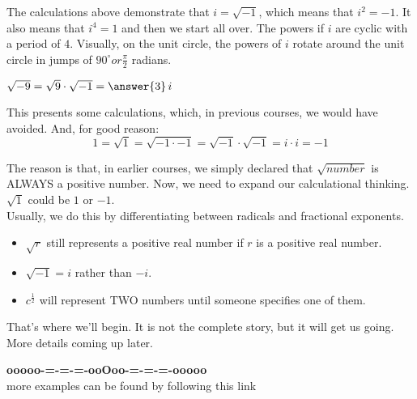 \documentclass{ximera}
\begin{document}
The calculations above demonstrate that $i = \sqrt{-1}$, which means that $i^2 = -1$.  It also means that $i^4 = 1$ and then we start all over.  The powers if $i$ are cyclic with a period of $4$.  Visually, on the unit circle, the powers of $i$ rotate around the unit circle in jumps of $90^{\circ} or \frac{\pi}{2}$ radians.

\begin{question}


$\sqrt{-9} = \sqrt{9} \cdot \sqrt{-1} =  \answer{3} \, i$

\end{question}

This presents some calculations, which, in previous courses, we would have avoided. And, for good reason:\\

\[  1 = \sqrt{1} = \sqrt{-1 \cdot -1} = \sqrt{-1} \cdot \sqrt{-1} = i \cdot i = -1   \]


The reason is that, in earlier courses, we simply declared that $\sqrt{number}$ is ALWAYS a positive number.  Now, we need to expand our calculational thinking. $\sqrt{1}$ could be $1$ or $-1$. \\

Usually, we do this by differentiating between radicals and fractional exponents.\\

\begin{itemize}
\item $\sqrt{r}$ still represents a positive real number if $r$ is a positive real number.
\item $\sqrt{-1} = i$ rather than $-i$.
\item $c^{\tfrac{1}{2}}$ will represent TWO numbers until someone specifies one of them.
\end{itemize}

That's where we'll begin.  It is not the complete story, but it will get us going.  More details coming up later.





\begin{center}
\textbf{\textcolor{green!50!black}{ooooo-=-=-=-ooOoo-=-=-=-ooooo}} \\

more examples can be found by following this link\\ 

\end{center}
\end{document}
